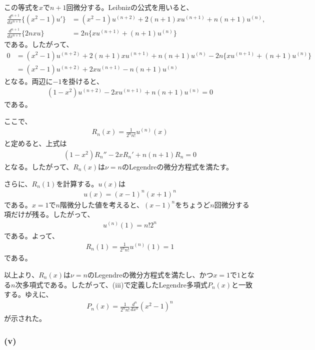 \documentclass[platex,dvipdfmx,a4paper]{jsarticle}
\begin{document}
  この等式を$x$で$n+1$回微分する。Leibnizの公式を用いると、
  \begin{align*}
    \frac{d^{n+1}}{dx^{n+1}}\{(x^2-1)u'\}
    &=(x^2-1)u^{(n+2)}+2(n+1)xu^{(n+1)}+n(n+1)u^{(n)},\\
    \frac{d^{n+1}}{dx^{n+1}}\{2nxu\}
    &=2n\{xu^{(n+1)}+(n+1)u^{(n)}\}
  \end{align*}
  である。したがって、
  \begin{align*}
    0
    &=(x^2-1)u^{(n+2)}+2(n+1)xu^{(n+1)}+n(n+1)u^{(n)}
      -2n\{xu^{(n+1)}+(n+1)u^{(n)}\}\\
    &=(x^2-1)u^{(n+2)}+2xu^{(n+1)}-n(n+1)u^{(n)}
  \end{align*}
  となる。両辺に$-1$を掛けると、
  \begin{align*}
    (1-x^2)u^{(n+2)}-2xu^{(n+1)}+n(n+1)u^{(n)}=0
  \end{align*}
  である。
  
  ここで、
  \begin{align*}
    R_n(x)=\frac{1}{2^n n!}u^{(n)}(x)
  \end{align*}
  と定めると、上式は
  \begin{align*}
    (1-x^2)R_n''-2xR_n'+n(n+1)R_n=0
  \end{align*}
  となる。したがって、$R_n(x)$は$\nu=n$のLegendreの微分方程式を満たす。
  
  さらに、$R_n(1)$を計算する。$u(x)$は
  \begin{align*}
    u(x)=(x-1)^n(x+1)^n
  \end{align*}
  である。$x=1$で$n$階微分した値を考えると、$(x-1)^n$をちょうど$n$回微分する項だけが残る。したがって、
  \begin{align*}
    u^{(n)}(1)=n!2^n
  \end{align*}
  である。よって、
  \begin{align*}
    R_n(1)=\frac{1}{2^n n!}u^{(n)}(1)=1
  \end{align*}
  である。
  
  以上より、$R_n(x)$は$\nu=n$のLegendreの微分方程式を満たし、かつ$x=1$で$1$となる$n$次多項式である。したがって、(iii)で定義したLegendre多項式$P_n(x)$と一致する。ゆえに、
  \begin{align*}
    P_n(x)=\frac{1}{2^n n!}\frac{d^n}{dx^n}(x^2-1)^n
  \end{align*}
  が示された。
  
  \subsubsection*{(v)}
  
\end{document}
